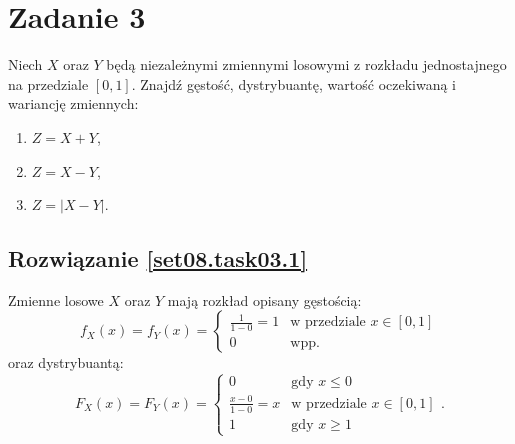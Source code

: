 \section{Zadanie 3}
Niech \(X\) oraz \(Y\) będą niezależnymi zmiennymi losowymi z rozkładu
jednostajnego na przedziale \([0, 1]\). Znajdź gęstość, dystrybuantę, wartość
oczekiwaną i wariancję zmiennych:

\begin{enumerate}[label=(\roman*)]
	\item\label{set08.task03.1} \(Z = X + Y\),
	\item\label{set08.task03.2} \(Z = X - Y\),
	\item\label{set08.task03.3} \(Z = |X - Y|\).
\end{enumerate}

\subsection*{Rozwiązanie \ref{set08.task03.1}}

Zmienne losowe \(X\) oraz \(Y\) mają rozkład opisany gęstością:
\[
	f_X(x) = f_Y(x)
	= \begin{cases}
		\frac{1}{1-0} = 1 & \text{w przedziale } x \in [0, 1] \\
		0                 & \text{wpp.}
	\end{cases}
\]
oraz dystrybuantą:
\[
	F_X(x) = F_Y(x)
	= \begin{cases}
		0                   & \text{gdy } x \leq 0              \\
		\frac{x-0}{1-0} = x & \text{w przedziale } x \in [0, 1] \\
		1                   & \text{gdy } x \geq 1
	\end{cases}.
\]

